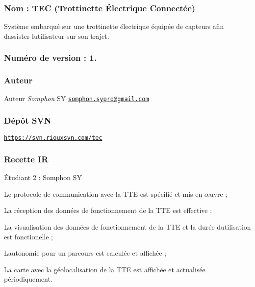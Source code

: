 \subsubsection*{Nom \+: T\+EC (\hyperlink{class_trottinette}{Trottinette} Électrique Connectée)}

Système embarqué sur une trottinette électrique équipée de capteurs afin d\textquotesingle{}assister l\textquotesingle{}utilisateur sur son trajet.

\subsubsection*{Numéro de version \+: 1.}

\subsubsection*{Auteur}

\begin{DoxyAuthor}{Auteur}
{\itshape Somphon} SY \href{mailto:somphon.sypro@gmail.com}{\tt somphon.\+sypro@gmail.\+com}
\end{DoxyAuthor}
\subsubsection*{Dépôt S\+VN}

\href{https://svn.riouxsvn.com/tec}{\tt https\+://svn.\+riouxsvn.\+com/tec}

\subsubsection*{Recette IR}


\begin{DoxyItemize}
\item Étudiant 2 \+: Somphon SY
\item Le protocole de communication avec la T\+TE est spécifié et mis en œuvre ;
\item La réception des données de fonctionnement de la T\+TE est effective ;
\item La visualisation des données de fonctionnement de la T\+TE et la durée d\textquotesingle{}utilisation est fonctionelle ;
\item L\textquotesingle{}autonomie pour un parcours est calculée et affichée ;
\item La carte avec la géolocalisation de la T\+TE est affichée et actualisée périodiquement. 
\end{DoxyItemize}
